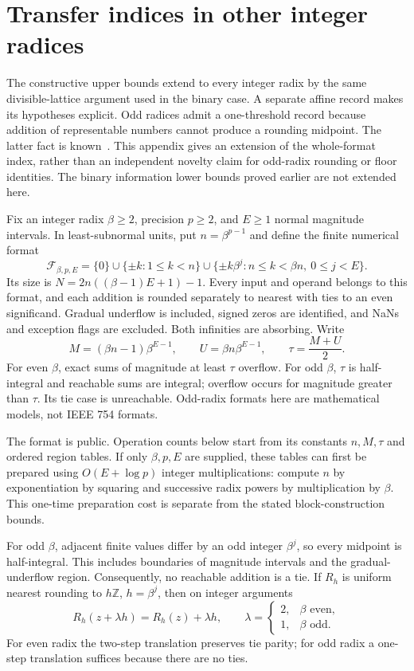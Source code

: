 \section{Transfer indices in other integer radices}\label{radix:section}

The constructive upper bounds extend to every integer radix by the same
divisible-lattice argument used in the binary case. A separate affine
record makes its hypotheses explicit. Odd radices admit a one-threshold
record because addition of representable numbers cannot produce a
rounding midpoint. The latter fact is known~\cite[Lemma~19]{roux2014}.
This appendix gives an extension of the whole-format index, rather than
an independent novelty claim for odd-radix rounding or floor identities.
The binary information lower bounds proved earlier are not extended here.

Fix an integer radix $\beta\geq2$, precision $p\geq2$, and $E\geq1$
normal magnitude intervals. In least-subnormal units, put $n=\beta^{p-1}$
and define the finite numerical format
\begin{equation}\label{radix:eq:format}
 \mathcal F_{\beta,p,E}
 =\{0\}\cup\{\pm k:1\leq k<n\}
 \cup\{\pm k\beta^j:n\leq k<\beta n,\ 0\leq j<E\}.
\end{equation}
Its size is $N=2n((\beta-1)E+1)-1$. Every input and operand belongs to
this format, and each addition is rounded separately to nearest with
ties to an even significand. Gradual underflow is included, signed zeros
are identified, and NaNs and exception flags are excluded. Both
infinities are absorbing. Write
\[
 M=(\beta n-1)\beta^{E-1},\qquad
 U=\beta n\beta^{E-1},\qquad \tau=\frac{M+U}{2}.
\]
For even $\beta$, exact sums of magnitude at least $\tau$ overflow.
For odd $\beta$, $\tau$ is half-integral and reachable sums are integral;
overflow occurs for magnitude greater than $\tau$. Its tie case is
unreachable. Odd-radix formats here are mathematical models, not IEEE
754 formats.

The format is public. Operation counts below start from its constants
$n,M,\tau$ and ordered region tables. If only $\beta,p,E$ are supplied,
these tables can first be prepared using $O(E+\log p)$ integer
multiplications: compute $n$ by exponentiation by squaring and successive
radix powers by multiplication by $\beta$. This one-time preparation
cost is separate from the stated block-construction bounds.

For odd $\beta$, adjacent finite values differ by an odd integer
$\beta^j$, so every midpoint is half-integral. This includes boundaries
of magnitude intervals and the gradual-underflow region. Consequently,
no reachable addition is a tie. If $R_h$ is uniform nearest rounding to
$h\mathbb Z$, $h=\beta^j$, then on integer arguments
\[
 R_h(z+\lambda h)=R_h(z)+\lambda h,
 \qquad
 \lambda=\begin{cases}2,&\beta\text{ even},\\1,&\beta\text{ odd}.
 \end{cases}
\]
For even radix the two-step translation preserves tie parity; for odd
radix a one-step translation suffices because there are no ties.

